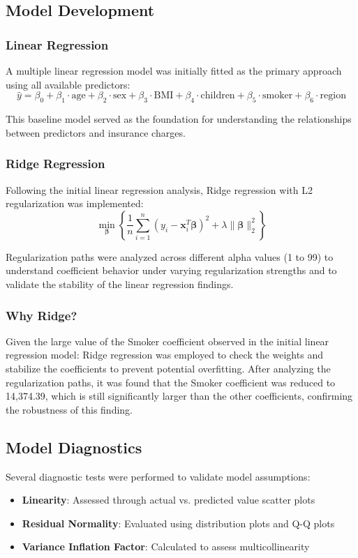\documentclass[12pt,a4paper]{article}
\begin{document}
\subsection{Model Development}

\subsubsection{Linear Regression}
A multiple linear regression model was initially fitted as the primary approach using all available predictors:
$$\hat{y} = \beta_0 + \beta_1 \cdot \text{age} + \beta_2 \cdot \text{sex} + \beta_3 \cdot \text{BMI} + \beta_4 \cdot \text{children} + \beta_5 \cdot \text{smoker} + \beta_6 \cdot \text{region}$$

This baseline model served as the foundation for understanding the relationships between predictors and insurance charges.

\subsubsection{Ridge Regression}  
Following the initial linear regression analysis, Ridge regression with L2 regularization was implemented:
$$\min_{\boldsymbol{\beta}} \left\{ \frac{1}{n}\sum_{i=1}^{n}(y_i - \mathbf{x}_i^T\boldsymbol{\beta})^2 + \lambda\|\boldsymbol{\beta}\|_2^2 \right\}$$

Regularization paths were analyzed across different alpha values (1 to 99) to understand coefficient behavior under varying regularization strengths and to validate the stability of the linear regression findings.

\subsubsection{Why Ridge?}
Given the large value of the Smoker coefficient observed in the initial linear regression model:
Ridge regression was employed to check the weights and stabilize the coefficients to prevent potential overfitting. After analyzing the regularization paths, it was found that the Smoker coefficient was reduced to 14,374.39, which is still significantly larger than the other coefficients, confirming the robustness of this finding.

\subsection{Model Diagnostics}

Several diagnostic tests were performed to validate model assumptions:
\begin{itemize}
    \item \textbf{Linearity}: Assessed through actual vs. predicted value scatter plots
    \item \textbf{Residual Normality}: Evaluated using distribution plots and Q-Q plots
    \item \textbf{Variance Inflation Factor}: Calculated to assess multicollinearity
\end{itemize}
\end{document}
